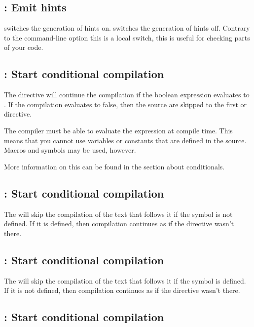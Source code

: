 \documentclass{report}
\begin{document}
\subsection{ : Emit hints}

 switches the generation of hints on. 
 switches the generation of hints off. 
Contrary to the command-line option  this is a local switch, 
this is useful for checking parts of your code.

\subsection{ : Start conditional compilation}

The directive  will continue the compilation
if the boolean expression  evaluates to . If the 
compilation evaluates to false, then the source are skipped to the first
 or  directive.

The compiler must be able to evaluate the expression at compile time.
This means that you cannot use variables or constants that are defined in
the source. Macros and symbols may be used, however.   

More information on this can be found in the section about 
conditionals.

\subsection{ : Start conditional compilation}

The  will skip the compilation of the text that
follows it if the symbol  is not defined. If it is defined, then
compilation continues as if the directive wasn't there. 

\subsection{ : Start conditional compilation}

The  will skip the compilation of the text that
follows it if the symbol  is defined. If it is not defined, then
compilation continues as if the directive wasn't there. 

\subsection{ : Start conditional compilation}
\end{document}
